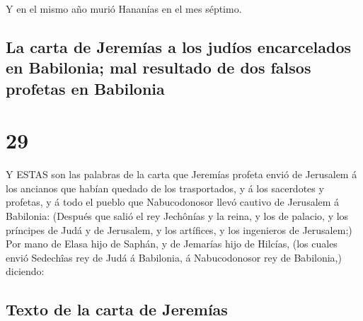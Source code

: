  Y en el mismo año murió Hananías en el mes séptimo.

\hypertarget{la-carta-de-jeremuxedas-a-los-juduxedos-encarcelados-en-babilonia-mal-resultado-de-dos-falsos-profetas-en-babilonia}{%
\subsection{La carta de Jeremías a los judíos encarcelados en Babilonia;
mal resultado de dos falsos profetas en
Babilonia}\label{la-carta-de-jeremuxedas-a-los-juduxedos-encarcelados-en-babilonia-mal-resultado-de-dos-falsos-profetas-en-babilonia}}

\hypertarget{section-28}{%
\section{29}\label{section-28}}

 Y ESTAS son las palabras de la carta que Jeremías profeta
envió de Jerusalem á los ancianos que habían quedado de los
trasportados, y á los sacerdotes y profetas, y á todo el pueblo que
Nabucodonosor llevó cautivo de Jerusalem á Babilonia: 
(Después que salió el rey Jechônías y la reina, y los de palacio, y los
príncipes de Judá y de Jerusalem, y los artífices, y los ingenieros de
Jerusalem;)  Por mano de Elasa hijo de Saphán, y de Jemarías
hijo de Hilcías, (los cuales envió Sedechîas rey de Judá á Babilonia, á
Nabucodonosor rey de Babilonia,) diciendo:

\hypertarget{texto-de-la-carta-de-jeremuxedas}{%
\subsection{Texto de la carta de
Jeremías}\label{texto-de-la-carta-de-jeremuxedas}}

